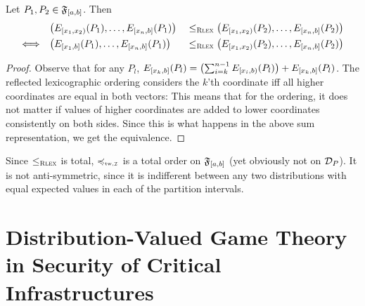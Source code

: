 \documentclass[a4paper]{scrreprt}
\begin{document}
    \begin{lemma}
        Let $P_1, P_2 \in \mathfrak{F}_{[a, b]}$.
        Then
        \begin{alignat*}{3}
                                     &\bigl(E_{[x_1, x_2)}(P_{1}), \dots, E_{[x_n, b]}(P_1)\bigr)\; &\leq_{\textsc{Rlex}} \bigl(E_{[x_1, x_2)}(P_2), \dots, E_{[x_n, b]}(P_2)\bigr) \\
            \Longleftrightarrow\quad &\bigl(E_{[x_1, b]}(P_{1}), \dots, E_{[x_n, b]}(P_1)\bigr) &\leq_{\textsc{Rlex}} \bigl(E_{[x_1, x_2)}(P_2), \dots, E_{[x_n, b]}(P_2)\bigr)
        \end{alignat*}
    \end{lemma}
    \begin{proof}
        Observe that for any $P_l$, $E_{[x_k, b]}(P_l) = \bigl(\sum_{i=k}^{n-1} E_{[x_i, b)}(P_l)\bigr) + E_{[x_k, b]}(P_l)$.
        The reflected lexicographic ordering considers the $k$'th coordinate iff all higher coordinates are equal in both vectors:
        This means that for the ordering, it does not matter if values of higher coordinates are added to lower coordinates consistently on both sides.
        Since this is what happens in the above sum representation, we get the equivalence.
    \end{proof}

    Since $\leq_{\textsc{Rlex}}$ is total, $\leqtw$ is a total order on $\mathfrak{F}_{[a, b]}$ (yet obviously not on $\mathcal{D}_P$). It is not anti-symmetric, since it is indifferent between any two distributions with equal expected values in each of the partition intervals.
    
    \chapter{Distribution-Valued Game Theory in Security of Critical Infrastructures}
    
    \printbibliography
\end{document}
